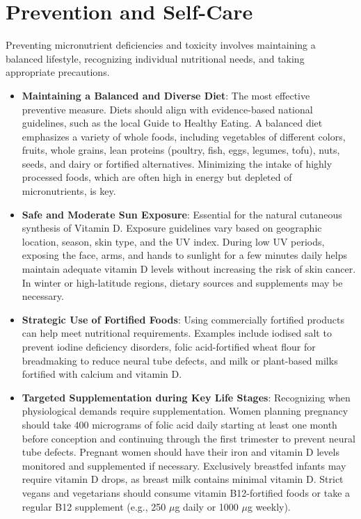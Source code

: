 \section*{Prevention and Self-Care}
Preventing micronutrient deficiencies and toxicity involves maintaining a balanced lifestyle, recognizing individual nutritional needs, and taking appropriate precautions.
\begin{itemize}
\item \textbf{Maintaining a Balanced and Diverse Diet}: The most effective preventive measure. Diets should align with evidence-based national guidelines, such as the local Guide to Healthy Eating. A balanced diet emphasizes a variety of whole foods, including vegetables of different colors, fruits, whole grains, lean proteins (poultry, fish, eggs, legumes, tofu), nuts, seeds, and dairy or fortified alternatives. Minimizing the intake of highly processed foods, which are often high in energy but depleted of micronutrients, is key.
\item \textbf{Safe and Moderate Sun Exposure}: Essential for the natural cutaneous synthesis of Vitamin D. Exposure guidelines vary based on geographic location, season, skin type, and the UV index. During low UV periods, exposing the face, arms, and hands to sunlight for a few minutes daily helps maintain adequate vitamin D levels without increasing the risk of skin cancer. In winter or high-latitude regions, dietary sources and supplements may be necessary.
\item \textbf{Strategic Use of Fortified Foods}: Using commercially fortified products can help meet nutritional requirements. Examples include iodised salt to prevent iodine deficiency disorders, folic acid-fortified wheat flour for breadmaking to reduce neural tube defects, and milk or plant-based milks fortified with calcium and vitamin D.
\item \textbf{Targeted Supplementation during Key Life Stages}: Recognizing when physiological demands require supplementation. Women planning pregnancy should take 400 micrograms of folic acid daily starting at least one month before conception and continuing through the first trimester to prevent neural tube defects. Pregnant women should have their iron and vitamin D levels monitored and supplemented if necessary. Exclusively breastfed infants may require vitamin D drops, as breast milk contains minimal vitamin D. Strict vegans and vegetarians should consume vitamin B12-fortified foods or take a regular B12 supplement (e.g., 250 $\mu$g daily or 1000 $\mu$g weekly).

\end{itemize}
